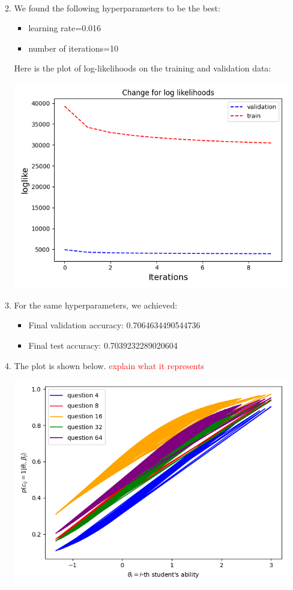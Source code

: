 \documentclass{article}
\begin{document}
\begin{enumerate}[label=\arabic*.]
\begin{enumerate}[label=(\alph*)]
\begin{align*}
                \end{align*}
            \item We found the following hyperparameters to be the best:
                \begin{itemize}
                    \item learning rate=0.016
                    \item number of iterations=10 
                \end{itemize}
                Here is the plot of log-likelihoods on the training and validation data:
                \begin{center}
                    \includegraphics[width=0.6\linewidth]{../starter_code/irt_output/myplot.png}
                \end{center}
            \item For the same hyperparameters, we achieved:
                \begin{itemize}
                    \item Final validation accuracy: 0.7064634490544736
                    \item Final test accuracy: 0.7039232289020604
                \end{itemize}
            \item The plot is shown below. \textcolor{red}{explain what it represents}
                \begin{center}
                    \includegraphics[width=0.6\linewidth]{../starter_code/irt_output/partd.png}
                \end{center}
        \end{enumerate}
        

\end{enumerate}
\end{document}
